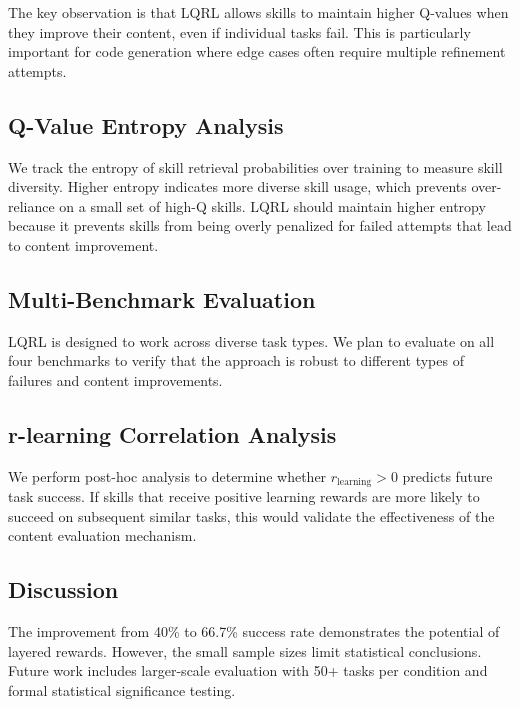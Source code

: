 The key observation is that LQRL allows skills to maintain higher Q-values when they improve their content, even if individual tasks fail. This is particularly important for code generation where edge cases often require multiple refinement attempts.

\subsection{Q-Value Entropy Analysis}

We track the entropy of skill retrieval probabilities over training to measure skill diversity. Higher entropy indicates more diverse skill usage, which prevents over-reliance on a small set of high-Q skills. LQRL should maintain higher entropy because it prevents skills from being overly penalized for failed attempts that lead to content improvement.

\subsection{Multi-Benchmark Evaluation}

LQRL is designed to work across diverse task types. We plan to evaluate on all four benchmarks to verify that the approach is robust to different types of failures and content improvements.

\subsection{r-learning Correlation Analysis}

We perform post-hoc analysis to determine whether $r_{\text{learning}} > 0$ predicts future task success. If skills that receive positive learning rewards are more likely to succeed on subsequent similar tasks, this would validate the effectiveness of the content evaluation mechanism.

\subsection{Discussion}

The improvement from 40\% to 66.7\% success rate demonstrates the potential of layered rewards. However, the small sample sizes limit statistical conclusions. Future work includes larger-scale evaluation with 50+ tasks per condition and formal statistical significance testing.
